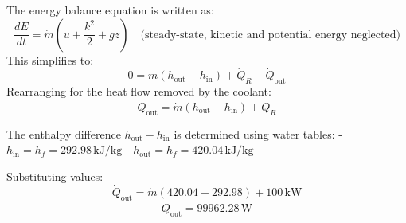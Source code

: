 The energy balance equation is written as:  
\[
\frac{dE}{dt} = \dot{m}(u + \frac{k^2}{2} + gz) \quad \text{(steady-state, kinetic and potential energy neglected)}
\]  
This simplifies to:  
\[
0 = \dot{m}(h_{\text{out}} - h_{\text{in}}) + \dot{Q}_R - \dot{Q}_{\text{out}}
\]  
Rearranging for the heat flow removed by the coolant:  
\[
\dot{Q}_{\text{out}} = \dot{m}(h_{\text{out}} - h_{\text{in}}) + \dot{Q}_R
\]  

The enthalpy difference \( h_{\text{out}} - h_{\text{in}} \) is determined using water tables:  
- \( h_{\text{in}} = h_f = 292.98 \, \text{kJ/kg} \)  
- \( h_{\text{out}} = h_f = 420.04 \, \text{kJ/kg} \)  

Substituting values:  
\[
\dot{Q}_{\text{out}} = \dot{m}(420.04 - 292.98) + 100 \, \text{kW}
\]  
\[
\dot{Q}_{\text{out}} = 99962.28 \, \text{W}
\]